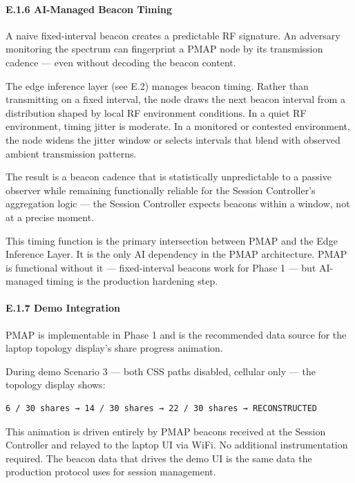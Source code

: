 \documentclass[
  11pt,
]{article}
\begin{document}
\hypertarget{e.1.6-ai-managed-beacon-timing}{%
\paragraph{E.1.6 AI-Managed Beacon
Timing}\label{e.1.6-ai-managed-beacon-timing}}

A naive fixed-interval beacon creates a predictable RF signature. An
adversary monitoring the spectrum can fingerprint a PMAP node by its
transmission cadence --- even without decoding the beacon content.

The edge inference layer (see E.2) manages beacon timing. Rather than
transmitting on a fixed interval, the node draws the next beacon
interval from a distribution shaped by local RF environment conditions.
In a quiet RF environment, timing jitter is moderate. In a monitored or
contested environment, the node widens the jitter window or selects
intervals that blend with observed ambient transmission patterns.

The result is a beacon cadence that is statistically unpredictable to a
passive observer while remaining functionally reliable for the Session
Controller's aggregation logic --- the Session Controller expects
beacons within a window, not at a precise moment.

This timing function is the primary intersection between PMAP and the
Edge Inference Layer. It is the only AI dependency in the PMAP
architecture. PMAP is functional without it --- fixed-interval beacons
work for Phase 1 --- but AI-managed timing is the production hardening
step.

\hypertarget{e.1.7-demo-integration}{%
\paragraph{E.1.7 Demo Integration}\label{e.1.7-demo-integration}}

PMAP is implementable in Phase 1 and is the recommended data source for
the laptop topology display's share progress animation.

During demo Scenario 3 --- both CSS paths disabled, cellular only ---
the topology display shows:

\begin{verbatim}
6 / 30 shares → 14 / 30 shares → 22 / 30 shares → RECONSTRUCTED
\end{verbatim}

This animation is driven entirely by PMAP beacons received at the
Session Controller and relayed to the laptop UI via WiFi. No additional
instrumentation required. The beacon data that drives the demo UI is the
same data the production protocol uses for session management.
\end{document}
